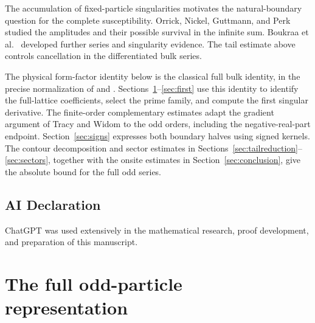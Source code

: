 \documentclass[11pt]{article}
\numberwithin{equation}{section}
\theoremstyle{definition}
\begin{document}
The accumulation of fixed-particle singularities motivates the
natural-boundary question for the complete susceptibility. Orrick,
Nickel, Guttmann, and Perk \cite[Section~3.2]{Orrick2001} studied the
amplitudes and their possible survival in the infinite sum. Boukraa
et al.\ \cite{Boukraa2008} developed further series and singularity
evidence. The tail estimate above controls cancellation in the
differentiated bulk series.

The physical form-factor identity below is the classical full bulk
identity, in the precise normalization of \cite[eqs.~(1.9), (1.11),
(3.13), (3.17)--(3.20)]{Orrick2001} and \cite[eqs.~(3), (5)--(9)]{Boukraa2008}.
Sections~\ref{sec:setup}--\ref{sec:first} use this identity to identify
the full-lattice coefficients, select the prime family, and compute
the first singular derivative. The finite-order complementary
estimates adapt the gradient argument of Tracy and Widom
\cite{TW2014} to the odd orders, including the negative-real-part
endpoint. Section~\ref{sec:signs} expresses both boundary halves
using signed kernels. The contour decomposition and sector estimates
in Sections~\ref{sec:tailreduction}--\ref{sec:sectors}, together with the
onsite estimates in Section~\ref{sec:conclusion}, give the absolute
bound for the full odd series.

\subsection*{AI Declaration}
ChatGPT was used extensively in the mathematical research, proof development,
and preparation of this manuscript.

\tableofcontents

\section{The full odd-particle representation}\label{sec:setup}
\end{document}
